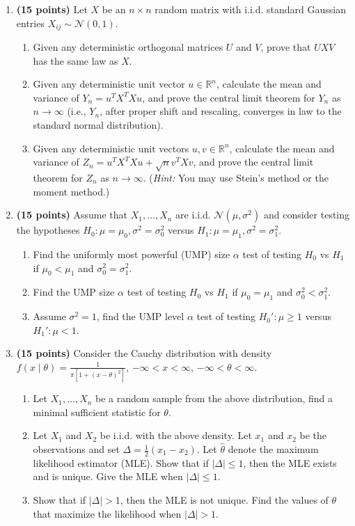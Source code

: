 \documentclass[11pt,a4paper]{article}
\begin{document}
\begin{enumerate}[label=\textbf{\arabic*.}]
    \item \textbf{(15 points)} Let $X$ be an $n \times n$ random matrix with i.i.d. standard Gaussian entries $X_{ij} \sim \mathcal{N}(0, 1)$.
    \begin{enumerate}[label=(\alph*)]
        \item Given any deterministic orthogonal matrices $U$ and $V$, prove that $UXV$ has the same law as $X$.
        \item Given any deterministic unit vector $u \in \mathbb{R}^n$, calculate the mean and variance of $Y_n = u^T X^T X u$, and prove the central limit theorem for $Y_n$ as $n \to \infty$ (i.e., $Y_n$, after proper shift and rescaling, converges in law to the standard normal distribution).
        \item Given any deterministic unit vectors $u, v \in \mathbb{R}^n$, calculate the mean and variance of $Z_n = u^T X^T X u + \sqrt{n} v^T X v$, and prove the central limit theorem for $Z_n$ as $n \to \infty$. (\textit{Hint:} You may use Stein's method or the moment method.)
    \end{enumerate}

    \item \textbf{(15 points)} Assume that $X_1, \dots, X_n$ are i.i.d. $\mathcal{N}(\mu, \sigma^2)$ and consider testing the hypotheses $H_0 : \mu = \mu_0, \sigma^2 = \sigma_0^2$ versus $H_1 : \mu = \mu_1, \sigma^2 = \sigma_1^2$.
    \begin{enumerate}[label=(\alph*)]
        \item Find the uniformly most powerful (UMP) size $\alpha$ test of testing $H_0$ vs $H_1$ if $\mu_0 < \mu_1$ and $\sigma_0^2 = \sigma_1^2$.
        \item Find the UMP size $\alpha$ test of testing $H_0$ vs $H_1$ if $\mu_0 = \mu_1$ and $\sigma_0^2 < \sigma_1^2$.
        \item Assume $\sigma^2 = 1$, find the UMP level $\alpha$ test of testing $H_0' : \mu \ge 1$ versus $H_1' : \mu < 1$.
    \end{enumerate}

    \item \textbf{(15 points)} Consider the Cauchy distribution with density $f(x \mid \theta) = \frac{1}{\pi [1 + (x - \theta)^2]}$, $-\infty < x < \infty$, $-\infty < \theta < \infty$.
    \begin{enumerate}[label=(\alph*)]
        \item Let $X_1, \dots, X_n$ be a random sample from the above distribution, find a minimal sufficient statistic for $\theta$.
        \item Let $X_1$ and $X_2$ be i.i.d. with the above density. Let $x_1$ and $x_2$ be the observations and set $\Delta = \frac{1}{2}(x_1 - x_2)$. Let $\hat{\theta}$ denote the maximum likelihood estimator (MLE). Show that if $|\Delta| \le 1$, then the MLE exists and is unique. Give the MLE when $|\Delta| \le 1$.
        \item Show that if $|\Delta| > 1$, then the MLE is not unique. Find the values of $\theta$ that maximize the likelihood when $|\Delta| > 1$.
    \end{enumerate}
\end{enumerate}
\end{document}
